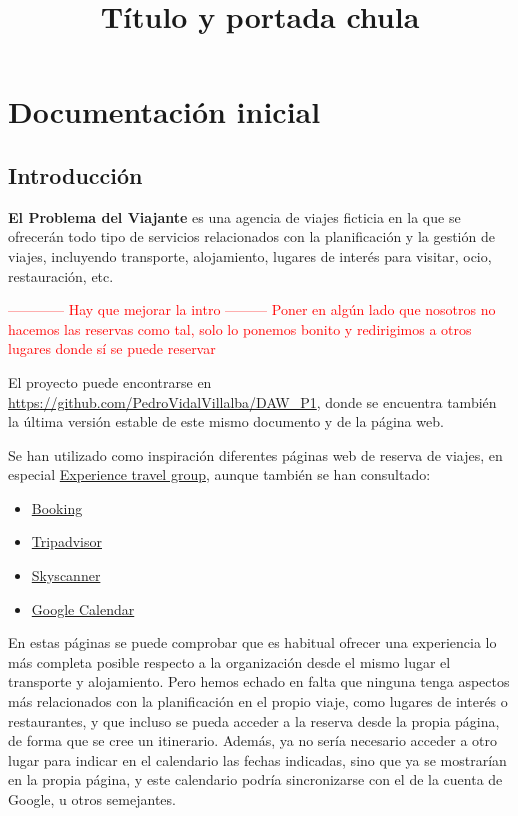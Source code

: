 \documentclass[11pt, a4paper]{book}
\title{Título y portada chula}
\begin{document}
	\maketitle
	
	\tableofcontents
	\newpage
	\thispagestyle{empty}
	
	\chapter{Documentación inicial}
	
	\section{Introducción}
	\textbf{El Problema del Viajante} es una agencia de viajes ficticia en la que se ofrecerán todo tipo de servicios relacionados con la planificación y la gestión de viajes, incluyendo transporte, alojamiento, lugares de interés para visitar, ocio, restauración, etc.
	
	\textcolor{red}{------------ Hay que mejorar la intro ---------}
	\textcolor{red}{Poner en algún lado que nosotros no hacemos las reservas como tal, solo lo ponemos bonito y redirigimos a otros lugares donde sí se puede reservar}
	
	El proyecto puede encontrarse en \href{https://github.com/PedroVidalVillalba/DAW_P1}{https://github.com/PedroVidalVillalba/DAW\_P1}, donde se encuentra también la última versión estable de este mismo documento y de la página web.
	
	
	Se han utilizado como inspiración diferentes páginas web de reserva de viajes, en especial \href{https://experiencetravelgroup.com}{Experience travel group}, aunque también se han consultado:
	\begin{itemize}
		\item \href{https://booking.com}{Booking}
		\item \href{https://tripadvisor.es}{Tripadvisor}
		\item \href{https://skyscanner.es}{Skyscanner}
		\item \href{https://calendar.google.com/calendar/u/0/r}{Google Calendar}
	\end{itemize}
	
	 En estas páginas se puede comprobar que es habitual ofrecer una experiencia lo más completa posible respecto a la organización desde el mismo lugar el transporte y alojamiento. Pero hemos echado en falta que ninguna tenga aspectos más relacionados con la planificación en el propio viaje, como lugares de interés o restaurantes, y que incluso se pueda acceder a la reserva desde la propia página, de forma que se cree un itinerario. Además, ya no sería necesario acceder a otro lugar para indicar en el calendario las fechas indicadas, sino que ya se mostrarían en la propia página, y este calendario podría sincronizarse con el de la cuenta de Google, u otros semejantes.
	
\end{document}
